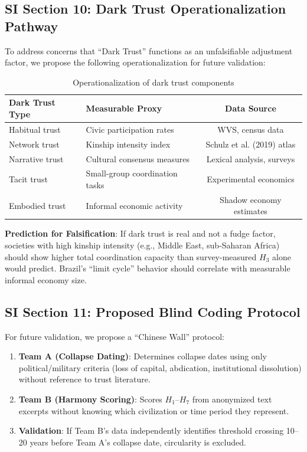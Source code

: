 \documentclass[11pt,a4paper]{article}
\newcommand{\Hthree}{H_3}
\begin{document}
\subsection{SI Section 10: Dark Trust Operationalization Pathway}

To address concerns that ``Dark Trust'' functions as an unfalsifiable adjustment factor, we propose the following operationalization for future validation:

\begin{table}[H]
\centering
\caption{Operationalization of dark trust components}
\begin{tabular}{llc}
\toprule
\textbf{Dark Trust Type} & \textbf{Measurable Proxy} & \textbf{Data Source} \\
\midrule
Habitual trust & Civic participation rates & WVS, census data \\
Network trust & Kinship intensity index & Schulz et al. (2019) atlas \\
Narrative trust & Cultural consensus measures & Lexical analysis, surveys \\
Tacit trust & Small-group coordination tasks & Experimental economics \\
Embodied trust & Informal economic activity & Shadow economy estimates \\
\bottomrule
\end{tabular}
\end{table}

\textbf{Prediction for Falsification}: If dark trust is real and not a fudge factor, societies with high kinship intensity (e.g., Middle East, sub-Saharan Africa) should show higher total coordination capacity than survey-measured $\Hthree$ alone would predict. Brazil's ``limit cycle'' behavior should correlate with measurable informal economy size.

\subsection{SI Section 11: Proposed Blind Coding Protocol}

For future validation, we propose a ``Chinese Wall'' protocol:

\begin{enumerate}
\item \textbf{Team A (Collapse Dating)}: Determines collapse dates using only political/military criteria (loss of capital, abdication, institutional dissolution) without reference to trust literature.

\item \textbf{Team B (Harmony Scoring)}: Scores $H_1$--$H_7$ from anonymized text excerpts without knowing which civilization or time period they represent.

\item \textbf{Validation}: If Team B's data independently identifies threshold crossing 10--20 years before Team A's collapse date, circularity is excluded.
\end{enumerate}
\end{document}
